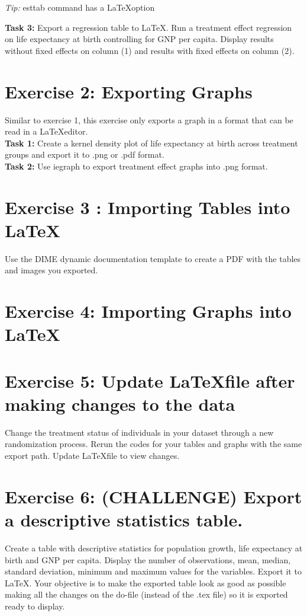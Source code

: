 \documentclass[12pts]{report}
\begin{document}
\begin{center}
	\colorbox{BurntOrange}{\emph{Tip:} esttab command has a \LaTeX\space option}
\end{center}

\textbf{Task 3:} Export a regression table to \LaTeX. Run a treatment effect regression on life expectancy at birth controlling for GNP per capita. Display results without fixed effects on column (1) and results with fixed effects on column (2).

\section*{Exercise 2: Exporting Graphs}
Similar to exercise 1, this exercise only exports a graph in a format that can be read in a \LaTeX\space editor. \\

\textbf{Task 1:}  Create a kernel density plot of life expectancy at birth across treatment groups and export it to .png or .pdf format. \\

\textbf{Task 2:}  Use iegraph to export treatment effect graphs into .png format.

\section*{Exercise 3 : Importing Tables into \LaTeX}
Use the DIME dynamic documentation template to create a PDF with the tables and images you exported.


\section*{Exercise 4: Importing Graphs into \LaTeX}

\section*{Exercise 5: Update \LaTeX\space file after making changes to the data}
Change the treatment status of individuals in your dataset through a new randomization process. Rerun the codes for your tables and graphs with the same export path. Update \LaTeX file to view changes.

\section*{Exercise 6: (CHALLENGE) Export a descriptive statistics table.}
Create a table with descriptive statistics for population growth, life expectancy at birth and GNP per capita. Display the number of observations, mean, median, standard deviation, minimum and maximum values for the variables. Export it to \LaTeX. Your objective is to make the exported table look as good as possible making all the changes on the do-file (instead of the .tex file) so it is exported ready to display.
\end{document}
